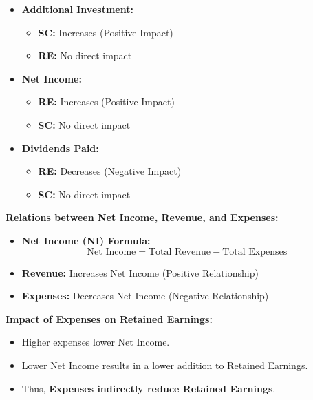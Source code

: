 \documentclass[12pt,a4paper]{book}
\begin{document}
\begin{itemize}
    \item \textbf{Additional Investment:} 
    \begin{itemize}
        \item \textbf{SC:} Increases (Positive Impact)
        \item \textbf{RE:} No direct impact
    \end{itemize}
    \item \textbf{Net Income:} 
    \begin{itemize}
        \item \textbf{RE:} Increases (Positive Impact)
        \item \textbf{SC:} No direct impact
    \end{itemize}
    \item \textbf{Dividends Paid:} 
    \begin{itemize}
        \item \textbf{RE:} Decreases (Negative Impact)
        \item \textbf{SC:} No direct impact
    \end{itemize}
\end{itemize}

\vspace{0.5cm}
\textbf{Relations between Net Income, Revenue, and Expenses:}

\begin{itemize}
    \item \textbf{Net Income (NI) Formula:} 
    \[
    \text{Net Income} = \text{Total Revenue} - \text{Total Expenses}
    \]
    \item \textbf{Revenue:} Increases Net Income (Positive Relationship)
    \item \textbf{Expenses:} Decreases Net Income (Negative Relationship)
\end{itemize}

\vspace{0.5cm}
\textbf{Impact of Expenses on Retained Earnings:}

\begin{itemize}
    \item Higher expenses lower Net Income.
    \item Lower Net Income results in a lower addition to Retained Earnings.
    \item Thus, \textbf{Expenses indirectly reduce Retained Earnings}.
\end{itemize}
\end{document}
